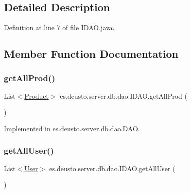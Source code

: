 \subsection{Detailed Description}


Definition at line 7 of file I\+D\+A\+O.\+java.



\subsection{Member Function Documentation}
\mbox{\label{interfacees_1_1deusto_1_1server_1_1db_1_1dao_1_1_i_d_a_o_a5a3e4739557f0af9060b4ca90e69c0e3}} 
\subsubsection{\texorpdfstring{get\+All\+Prod()}{getAllProd()}}
{\footnotesize\ttfamily List$<$\hyperlink{classes_1_1deusto_1_1server_1_1db_1_1data_1_1_product}{Product}$>$ es.\+deusto.\+server.\+db.\+dao.\+I\+D\+A\+O.\+get\+All\+Prod (\begin{DoxyParamCaption}{ }\end{DoxyParamCaption})}



Implemented in \hyperlink{classes_1_1deusto_1_1server_1_1db_1_1dao_1_1_d_a_o_a589bc944971075e694d9dc8eabf76870}{es.\+deusto.\+server.\+db.\+dao.\+D\+AO}.

\mbox{\label{interfacees_1_1deusto_1_1server_1_1db_1_1dao_1_1_i_d_a_o_affa6fc846698427199cb7305155a95c7}} 
\subsubsection{\texorpdfstring{get\+All\+User()}{getAllUser()}}
{\footnotesize\ttfamily List$<$\hyperlink{classes_1_1deusto_1_1server_1_1db_1_1data_1_1_user}{User}$>$ es.\+deusto.\+server.\+db.\+dao.\+I\+D\+A\+O.\+get\+All\+User (\begin{DoxyParamCaption}{ }\end{DoxyParamCaption})}



